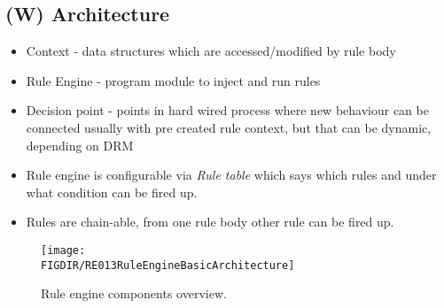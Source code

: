 \subsection{(W) Architecture}\label{s:RuleEngineArchitecture}
    \begin{itemize}
        \item Context - data structures which are accessed/modified by rule body 
        \item Rule Engine - program module to inject and run rules
        \item Decision point - points in hard wired process where new behaviour can be connected usually with pre created rule context, but that can be dynamic, depending on DRM
        \item Rule engine is configurable via \emph{Rule table} which says which rules and under what condition can be fired up.
        \item Rules are chain-able, from one rule body other rule can be fired up.
    \end{itemize}
    \begin{figure}[H]
        \centering
        \texttt{[image: \\FIGDIR/RE013RuleEngineBasicArchitecture]}
        \caption{Rule engine components overview.}
        \label{fig:RuleEngineBasicArchitecture}
    \end{figure}